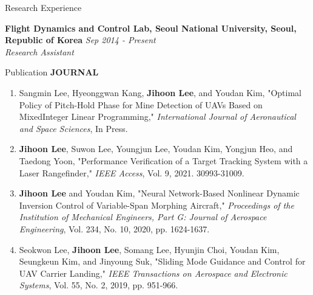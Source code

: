 \documentclass{resume}
\begin{document}
\begin{rSection}{Research Experience}\normalfont

{\bf Flight Dynamics and Control Lab, Seoul National University, Seoul, Republic of Korea} \hfill {\em Sep 2014 - Present} 
\\{\textit{Research Assistant}}

\end{rSection}

\begin{rSection}{Publication}\normalfont
	\textbf{JOURNAL}
	\begin{enumerate}\renewcommand{\labelenumi}{[J\theenumi]}
		\item Sangmin Lee, Hyeonggwan Kang, \textbf{\color{coolblack}Jihoon Lee}, and Youdan Kim, "Optimal Policy of Pitch-Hold Phase for Mine Detection of UAVs Based on MixedInteger Linear Programming," \textit{International Journal of Aeronautical and Space Sciences}, In Press.
		
		\item \textbf{\color{coolblack}Jihoon Lee}, Suwon Lee, Youngjun Lee, Youdan Kim, Yongjun Heo, and Taedong Yoon, "Performance Veriﬁcation of a Target Tracking System with a Laser Rangeﬁnder," \textit{IEEE Access}, Vol. 9, 2021. 30993-31009. 
		
		\item \textbf{\color{coolblack}Jihoon Lee} and Youdan Kim, "Neural Network-Based Nonlinear Dynamic Inversion Control of Variable-Span Morphing Aircraft," \textit{Proceedings of the Institution of Mechanical Engineers, Part G: Journal of Aerospace Engineering}, Vol. 234, No. 10, 2020, pp. 1624-1637. 
		
		\item Seokwon Lee, \textbf{\color{coolblack}Jihoon Lee}, Somang Lee, Hyunjin Choi, Youdan Kim, Seungkeun Kim, and Jinyoung Suk, "Sliding Mode Guidance and Control for UAV Carrier Landing," \textit{IEEE Transactions on Aerospace and Electronic Systems}, Vol. 55, No. 2, 2019, pp. 951-966. 
		

\end{enumerate}
\end{rSection}
\end{document}
